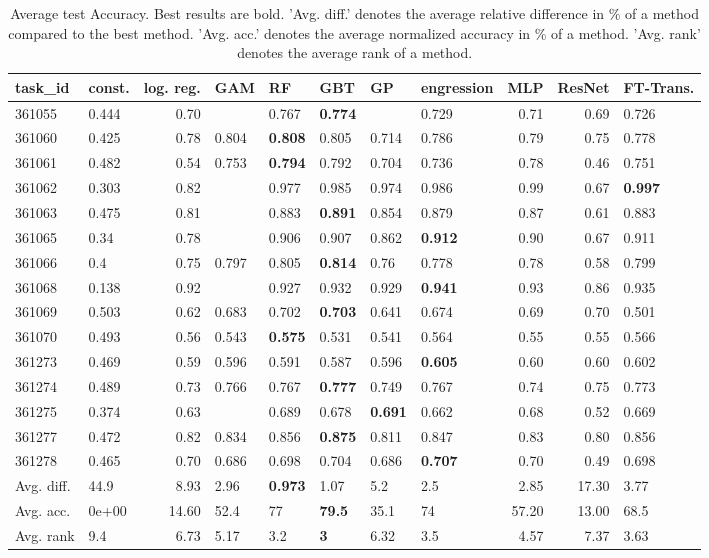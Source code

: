 \begin{table}[ht!]
\centering
\begingroup\footnotesize
\begin{tabular}{llrlllllrrl}
  \hline
\hline
task\_id & const. & log. reg. & GAM & RF & GBT & GP & engression & MLP & ResNet & FT-Trans. \\ 
  \hline
361055 & 0.444 & 0.70 &  & 0.767 & \textbf{0.774} &  & 0.729 & 0.71 & 0.69 & 0.726 \\ 
  361060 & 0.425 & 0.78 & 0.804 & \textbf{0.808} & 0.805 & 0.714 & 0.786 & 0.79 & 0.75 & 0.778 \\ 
  361061 & 0.482 & 0.54 & 0.753 & \textbf{0.794} & 0.792 & 0.704 & 0.736 & 0.78 & 0.46 & 0.751 \\ 
  361062 & 0.303 & 0.82 &  & 0.977 & 0.985 & 0.974 & 0.986 & 0.99 & 0.67 & \textbf{0.997} \\ 
  361063 & 0.475 & 0.81 &  & 0.883 & \textbf{0.891} & 0.854 & 0.879 & 0.87 & 0.61 & 0.883 \\ 
  361065 & 0.34 & 0.78 &  & 0.906 & 0.907 & 0.862 & \textbf{0.912} & 0.90 & 0.67 & 0.911 \\ 
  361066 & 0.4 & 0.75 & 0.797 & 0.805 & \textbf{0.814} & 0.76 & 0.778 & 0.78 & 0.58 & 0.799 \\ 
  361068 & 0.138 & 0.92 &  & 0.927 & 0.932 & 0.929 & \textbf{0.941} & 0.93 & 0.86 & 0.935 \\ 
  361069 & 0.503 & 0.62 & 0.683 & 0.702 & \textbf{0.703} & 0.641 & 0.674 & 0.69 & 0.70 & 0.501 \\ 
  361070 & 0.493 & 0.56 & 0.543 & \textbf{0.575} & 0.531 & 0.541 & 0.564 & 0.55 & 0.55 & 0.566 \\ 
  361273 & 0.469 & 0.59 & 0.596 & 0.591 & 0.587 & 0.596 & \textbf{0.605} & 0.60 & 0.60 & 0.602 \\ 
  361274 & 0.489 & 0.73 & 0.766 & 0.767 & \textbf{0.777} & 0.749 & 0.767 & 0.74 & 0.75 & 0.773 \\ 
  361275 & 0.374 & 0.63 &  & 0.689 & 0.678 & \textbf{0.691} & 0.662 & 0.68 & 0.52 & 0.669 \\ 
  361277 & 0.472 & 0.82 & 0.834 & 0.856 & \textbf{0.875} & 0.811 & 0.847 & 0.83 & 0.80 & 0.856 \\ 
  361278 & 0.465 & 0.70 & 0.686 & 0.698 & 0.704 & 0.686 & \textbf{0.707} & 0.70 & 0.49 & 0.698 \\ 
   \hline
Avg. diff. & 44.9 & 8.93 & 2.96 & \textbf{0.973} & 1.07 & 5.2 & 2.5 & 2.85 & 17.30 & 3.77 \\ 
  Avg. acc. & 0e+00 & 14.60 & 52.4 & 77 & \textbf{79.5} & 35.1 & 74 & 57.20 & 13.00 & 68.5 \\ 
  Avg. rank & 9.4 & 6.73 & 5.17 & 3.2 & \textbf{3} & 6.32 & 3.5 & 4.57 & 7.37 & 3.63 \\ 
   \hline
\hline
\end{tabular}
\endgroup
\caption{Average test Accuracy. 
                  Best results are bold. 
                  'Avg. diff.' denotes the average relative difference in \% of a method compared to the best method.
                  'Avg. acc.' denotes the average normalized accuracy in \% of a method.
                  'Avg. rank' denotes the average rank of a method.} 
\label{TABLES/table_results_Accuracy_umap}
\end{table}
